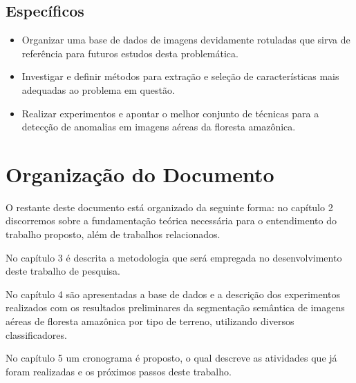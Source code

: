 \subsection{Específicos}

\begin{itemize}
    \item Organizar uma base de dados de imagens devidamente rotuladas que sirva de referência para futuros estudos desta problemática.
    \item Investigar e definir métodos para extração e seleção de características mais adequadas ao problema em questão.
    \item Realizar experimentos e apontar o melhor conjunto de técnicas para a detecção de anomalias em imagens aéreas da floresta amazônica.
\end{itemize}

\section{Organização do Documento}

O restante deste documento está organizado da seguinte forma: no capítulo 2 discorremos sobre a fundamentação teórica necessária para o entendimento do trabalho proposto, além de trabalhos relacionados.

No capítulo 3 é descrita a metodologia que será empregada no desenvolvimento deste trabalho de pesquisa.

No capítulo 4 são apresentadas a base de dados e a descrição dos experimentos realizados com os resultados preliminares da segmentação semântica de imagens aéreas de floresta amazônica por tipo de terreno, utilizando diversos classificadores.

No capítulo 5 um cronograma é proposto, o qual descreve as atividades que já foram realizadas e os próximos passos deste trabalho.
